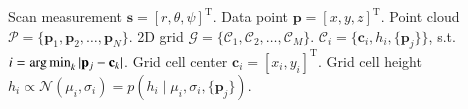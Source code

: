 Scan measurement $\mathbf{s}=[r,\theta,\psi]^\text{T}$. Data point $\mathbf{p}=
[x,y,z]^\text{T}$. Point cloud $\mathcal{P}=\{\mathbf{p}_1,\mathbf{p}_2,\dots,
\mathbf{p}_N\}$. 2D grid $\mathcal{G}=\{\mathcal{C}_1,\mathcal{C}_2,\dots,
\mathcal{C}_M\}$. $\mathcal{C}_i=\{\mathbf{c}_i,h_i,
\{\mathbf{p}_j\}\}$, s.t. $i=\operatorname*{arg\,min}_k |\mathbf{p}_j-\mathbf{c}_k|$. Grid cell
center $\mathbf{c}_i=[x_i,y_i]^\text{T}$. Grid cell height $h_i\propto
\mathcal{N}(\mu_i,\sigma_i)=p(h_i\mid\mu_i,\sigma_i,\{\mathbf{p}_j\})$.
